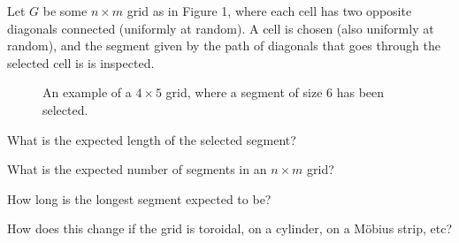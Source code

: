 \documentclass{article}
\begin{document}
Let $G$ be some $n \times m$ grid as in Figure 1, where each cell has two
opposite diagonals connected (uniformly at random).
A cell is chosen (also uniformly at random), and the segment given by the path of
diagonals that goes through the selected cell is is inspected.
\begin{figure}[!h]
  \centering
  \caption{
    An example of a $4 \times 5$ grid, where a segment of size $6$ has been selected.
  }
\end{figure}

\begin{question}
  What is the expected length of the selected segment?
\end{question}

\begin{related}
  \item What is the expected number of segments in an $n \times m$ grid?
  \item How long is the longest segment expected to be?
  \item How does this change if the grid is toroidal, on a cylinder,
    on a M\"obius strip, etc?
\end{related}
\end{document}
